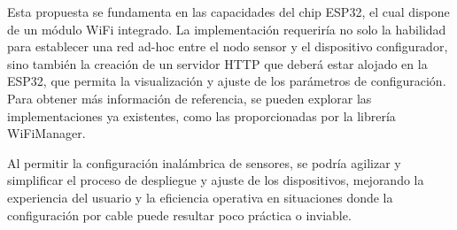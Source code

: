 Esta propuesta se fundamenta en las capacidades del chip ESP32, el cual dispone de un módulo WiFi integrado. La implementación requeriría
no solo la habilidad para establecer una red ad-hoc entre el nodo sensor y el dispositivo configurador, sino también la creación de un servidor HTTP
que deberá estar alojado en la ESP32, que permita la visualización y ajuste de los parámetros de configuración. Para obtener más información de referencia, se
pueden explorar las implementaciones ya existentes, como las proporcionadas por la librería WiFiManager.

Al permitir la configuración inalámbrica de sensores, se podría agilizar y simplificar el proceso de despliegue y ajuste de los dispositivos,
mejorando la experiencia del usuario y la eficiencia operativa en situaciones donde la configuración por cable puede resultar poco práctica o inviable.
